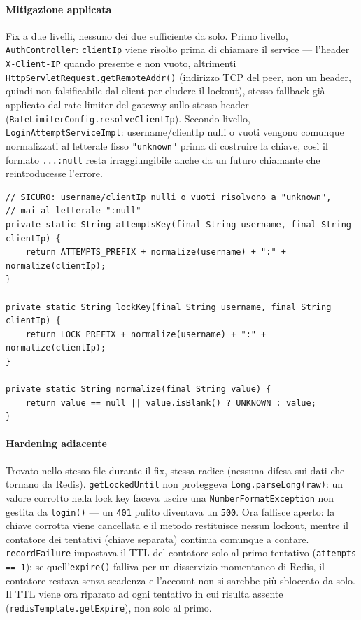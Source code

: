 ﻿\documentclass[a4paper,12pt]{report}
\begin{document}
\paragraph{Mitigazione applicata}
Fix a due livelli, nessuno dei due sufficiente da solo. Primo livello,
\texttt{AuthController}: \texttt{clientIp} viene risolto prima di chiamare
il service --- l'header \texttt{X-Client-IP} quando presente e non vuoto,
altrimenti \texttt{HttpServletRequest.getRemoteAddr()} (indirizzo TCP del
peer, non un header, quindi non falsificabile dal client per eludere il
lockout), stesso fallback già applicato dal rate limiter del gateway sullo
stesso header (\texttt{RateLimiterConfig.resolveClientIp}). Secondo
livello, \texttt{LoginAttemptServiceImpl}: username/clientIp nulli o vuoti
vengono comunque normalizzati al letterale fisso \texttt{"unknown"} prima
di costruire la chiave, così il formato \texttt{...\string:null} resta
irraggiungibile anche da un futuro chiamante che reintroducesse l'errore.

\begin{securebox}[title={Codice Sicuro --- LoginAttemptServiceImpl.java (fix)}]
\begin{lstlisting}[style=java]
// SICURO: username/clientIp nulli o vuoti risolvono a "unknown",
// mai al letterale ":null"
private static String attemptsKey(final String username, final String clientIp) {
    return ATTEMPTS_PREFIX + normalize(username) + ":" + normalize(clientIp);
}

private static String lockKey(final String username, final String clientIp) {
    return LOCK_PREFIX + normalize(username) + ":" + normalize(clientIp);
}

private static String normalize(final String value) {
    return value == null || value.isBlank() ? UNKNOWN : value;
}
\end{lstlisting}
\end{securebox}

\paragraph{Hardening adiacente}
Trovato nello stesso file durante il fix, stessa radice (nessuna difesa
sui dati che tornano da Redis). \texttt{getLockedUntil} non proteggeva
\texttt{Long.parseLong(raw)}: un valore corrotto nella lock key faceva
uscire una \texttt{NumberFormatException} non gestita da \texttt{login()}
--- un \texttt{401} pulito diventava un \texttt{500}. Ora fallisce aperto:
la chiave corrotta viene cancellata e il metodo restituisce nessun lockout,
mentre il contatore dei tentativi (chiave separata) continua comunque a
contare. \texttt{recordFailure} impostava il TTL del contatore solo al
primo tentativo (\texttt{attempts == 1}): se quell'\texttt{expire()}
falliva per un disservizio momentaneo di Redis, il contatore restava senza
scadenza e l'account non si sarebbe più sbloccato da solo. Il TTL viene ora
riparato ad ogni tentativo in cui risulta assente
(\texttt{redisTemplate.getExpire}), non solo al primo.
\end{document}
